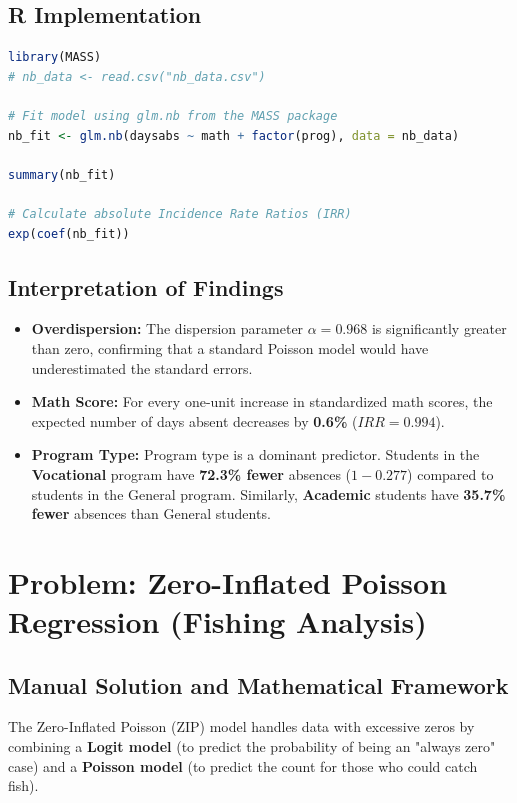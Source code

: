 \documentclass[12pt, a4paper]{article}
\begin{document}
\subsection{R Implementation}
\begin{lstlisting}[language=R, caption=R Negative Binomial Regression]
library(MASS)
# nb_data <- read.csv("nb_data.csv")

# Fit model using glm.nb from the MASS package
nb_fit <- glm.nb(daysabs ~ math + factor(prog), data = nb_data)

summary(nb_fit)

# Calculate absolute Incidence Rate Ratios (IRR)
exp(coef(nb_fit))
\end{lstlisting}

\subsection{Interpretation of Findings}
\begin{itemize}
    \item \textbf{Overdispersion:} The dispersion parameter $\alpha = 0.968$ is significantly greater than zero, confirming that a standard Poisson model would have underestimated the standard errors.
    \item \textbf{Math Score:} For every one-unit increase in standardized math scores, the expected number of days absent decreases by \textbf{0.6\%} ($IRR=0.994$).
    \item \textbf{Program Type:} Program type is a dominant predictor. Students in the \textbf{Vocational} program have \textbf{72.3\% fewer} absences ($1 - 0.277$) compared to students in the General program. Similarly, \textbf{Academic} students have \textbf{35.7\% fewer} absences than General students.
\end{itemize}

\newpage
\section{Problem: Zero-Inflated Poisson Regression (Fishing Analysis)}
\label{prob_zip_final}

\subsection{Manual Solution and Mathematical Framework}
The Zero-Inflated Poisson (ZIP) model handles data with excessive zeros by combining a \textbf{Logit model} (to predict the probability of being an "always zero" case) and a \textbf{Poisson model} (to predict the count for those who could catch fish).
\end{document}
